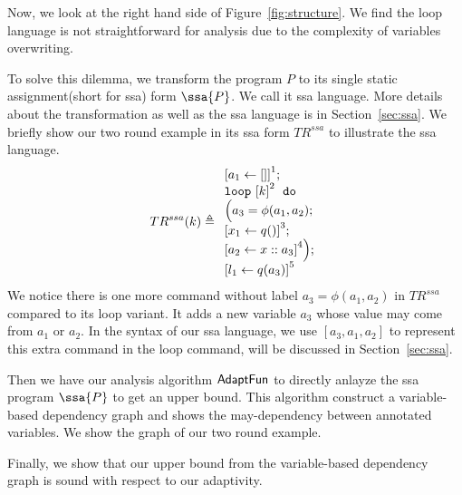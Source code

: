 Now, we look at the right hand side of Figure~\ref{fig:structure}. We find the loop language is not straightforward for analysis due to the complexity of variables overwriting. 

To solve this dilemma, we transform  the program $P$ to its single static assignment(short for ssa) form $\ssa{P}$. We call it ssa language. More details about the transformation as well as the ssa language is in Section~\ref{sec:ssa}.
We briefly show our two round example in its ssa form $TR^{ssa}$ to illustrate the ssa language.
\[
TR^{ssa}(k) \triangleq
{
\begin{array}{l}
   \clabel{ a_1 \leftarrow [] }^{1}; \\
    \eloop ~ \clabel{k}^{2} ~ \edo ~ \\
    \Big(
      a_3 = \phi(a_1,a_2); \\
     \clabel{x_1 \leftarrow q() }^{3}  ; \\
    \clabel{a_2 \leftarrow x :: a_3}^{4}      \Big); \\
    \clabel{l_1 \leftarrow q(a_3)}^{5}\\
\end{array}
}
\]
We notice there is one more command without label $a_3 = \phi(a_1,a_2)$ in $TR^{ssa}$ compared to its loop variant. It adds a new variable $a_3$ whose value may come from $a_1$ or $a_2$. In the syntax of our ssa language, we use $[a_3,a_1,a_2]$ to represent this extra command in the loop command, will be discussed in Section~\ref{sec:ssa}.

Then we have our analysis algorithm $\textsf{AdaptFun}$ to directly anlayze the ssa program $\ssa{P}$ to get an upper bound. This algorithm construct a variable-based dependency graph and shows the may-dependency between annotated variables. We show the graph of our two round example.

Finally, we show that our upper bound from the variable-based dependency graph is sound with respect to our adaptivity.



